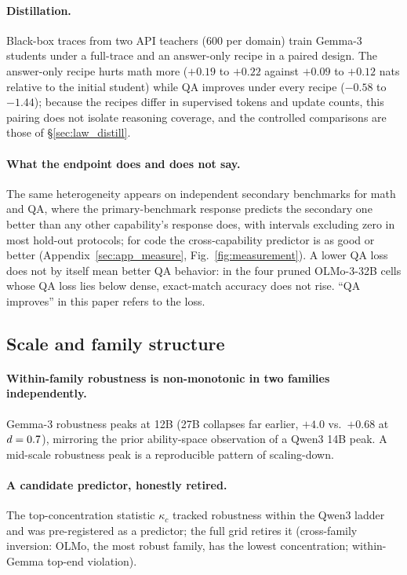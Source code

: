 \paragraph{Distillation.} Black-box traces from two API teachers (600
per domain) train Gemma-3 students under a full-trace and an
answer-only recipe in a paired design. The answer-only recipe hurts
math more ($+0.19$ to $+0.22$ against $+0.09$ to $+0.12$ nats relative
to the initial student) while QA improves under every recipe ($-0.58$
to $-1.44$); because the recipes differ in supervised tokens and update
counts, this pairing does not isolate reasoning coverage, and the
controlled comparisons are those of \S\ref{sec:law_distill}.

\paragraph{What the endpoint does and does not say.} The same
heterogeneity appears on independent secondary benchmarks for math and
QA, where the primary-benchmark response predicts the secondary one
better than any other capability's response does, with intervals
excluding zero in most hold-out protocols; for code the
cross-capability predictor is as good or better
(Appendix~\ref{sec:app_measure}, Fig.~\ref{fig:measurement}). A lower
QA loss does not by itself mean better QA behavior: in the four pruned
OLMo-3-32B cells whose QA loss lies below dense, exact-match accuracy
does not rise. ``QA improves'' in this paper refers to the loss.


\subsection{Scale and family structure}
\label{sec:family}

\paragraph{Within-family robustness is non-monotonic in two families
independently.} Gemma-3 robustness peaks at 12B (27B collapses far
earlier, $+4.0$ vs.\ $+0.68$ at $d=0.7$), mirroring the prior
ability-space observation of a Qwen3 14B peak. A mid-scale robustness
peak is a reproducible pattern of scaling-down.
\paragraph{A candidate predictor, honestly retired.} The
top-concentration statistic $\kappa_c$ tracked robustness within the
Qwen3 ladder and was pre-registered as a predictor; the full grid
retires it (cross-family inversion: OLMo, the most robust family,
has the lowest concentration; within-Gemma top-end violation).
